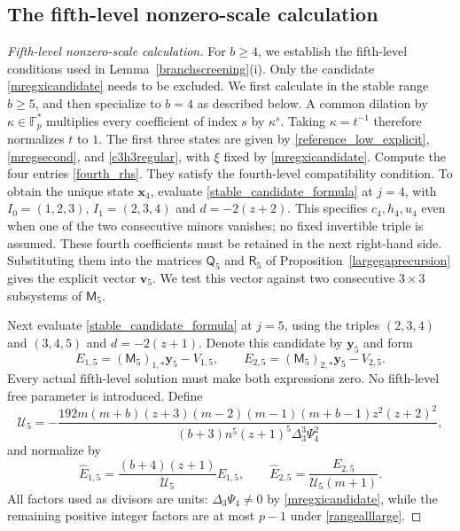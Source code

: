 \documentclass[12pt]{article}
\theoremstyle{remark}
\newcommand{\F}{\mathbb{F}_p}
\begin{document}
\subsection{The fifth-level nonzero-scale calculation}\label{app:fifth}

\begin{proof}[Fifth-level nonzero-scale calculation]
For $b\ge4$, we establish the fifth-level conditions used in
Lemma~\ref{branchscreening}(i).  Only the candidate
\eqref{mregxicandidate} needs to be excluded.  We first calculate in the
stable range $b\ge5$, and then specialize to $b=4$ as described below.
A common dilation by $\kappa\in\F^*$ multiplies every coefficient
of index $s$ by $\kappa^s$.  Taking $\kappa=t^{-1}$ therefore
normalizes $t$ to $1$.
The first three states are given by \eqref{reference_low_explicit},
\eqref{mregsecond}, and \eqref{c3h3regular}, with $\xi$ fixed by
\eqref{mregxicandidate}.
Compute the four entries \eqref{fourth_rhs}.  They satisfy the
fourth-level compatibility condition.  To obtain the unique state
$\mathbf x_4$, evaluate \eqref{stable_candidate_formula} at $j=4$,
with $I_0=(1,2,3)$, $I_1=(2,3,4)$ and $d=-2(z+2)$.
This specifies $c_4,h_4,u_4$ even when one of the two consecutive
minors vanishes; no fixed invertible triple is assumed.
These fourth coefficients must be retained in the next right-hand
side.  Substituting them into the matrices $\mathsf Q_5$ and
$\mathsf R_5$ of Proposition~\ref{largegaprecursion} gives the explicit
vector $\mathbf v_5$.  We test this vector against two consecutive $3\times3$ subsystems
of $\mathsf M_5$.

Next evaluate \eqref{stable_candidate_formula} at $j=5$, using the
triples $(2,3,4)$ and $(3,4,5)$ and $d=-2(z+1)$.
Denote this candidate by $\mathbf y_5$ and form
\[
 E_{1,5}=(\mathsf M_5)_{1,*}\mathbf y_5-V_{1,5},\qquad
 E_{2,5}=(\mathsf M_5)_{2,*}\mathbf y_5-V_{2,5}.
\]
Every actual fifth-level solution must make both expressions zero.
No fifth-level free parameter is introduced.  Define
\begin{equation}\label{U5}
 \mathcal U_5=-\frac{192m(m+b)(z+3)(m-2)(m-1)(m+b-1)z^2(z+2)^2}
 {(b+3)n^5(z+1)^5\Delta_3^3\Psi_4^2},
\end{equation}
and normalize by
\[
 \widehat E_{1,5}=\frac{(b+4)(z+1)}{\mathcal U_5}E_{1,5},
 \qquad
 \widehat E_{2,5}=\frac{E_{2,5}}{\mathcal U_5(m+1)}.
\]
All factors used as divisors are units: $\Delta_3\Psi_4\ne0$ by
\eqref{mregxicandidate}, while the remaining positive integer factors
are at most $p-1$ under \eqref{rangealllarge}.


\end{proof}
\end{document}
